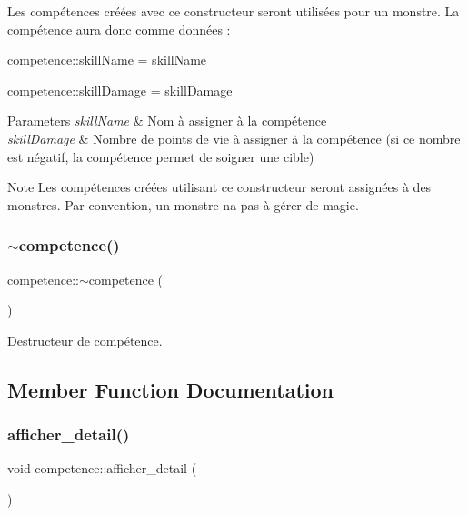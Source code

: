 Les compétences créées avec ce constructeur seront utilisées pour un monstre. La compétence aura donc comme données \+:
\begin{DoxyItemize}
\item competence\+::skill\+Name = skill\+Name
\item competence\+::skill\+Damage = skill\+Damage 
\begin{DoxyParams}{Parameters}
{\em skill\+Name} & Nom à assigner à la compétence \\
\hline
{\em skill\+Damage} & Nombre de points de vie à assigner à la compétence (si ce nombre est négatif, la compétence permet de soigner une cible) \\
\hline
\end{DoxyParams}
\begin{DoxyNote}{Note}
Les compétences créées utilisant ce constructeur seront assignées à des monstres. Par convention, un monstre n\textquotesingle{}a pas à gérer de magie. 
\end{DoxyNote}

\end{DoxyItemize}\mbox{\label{classcompetence_a158b19a476ae306eeaaa6672aab62e6c}} 
\subsubsection{\texorpdfstring{$\sim$competence()}{~competence()}}
{\footnotesize\ttfamily competence\+::$\sim$competence (\begin{DoxyParamCaption}{ }\end{DoxyParamCaption})}



Destructeur de compétence. 



\subsection{Member Function Documentation}
\mbox{\label{classcompetence_a8398d16c43f6ca6b44e3779730e022b6}} 
\subsubsection{\texorpdfstring{afficher\+\_\+detail()}{afficher\_detail()}}
{\footnotesize\ttfamily void competence\+::afficher\+\_\+detail (\begin{DoxyParamCaption}{ }\end{DoxyParamCaption})}



